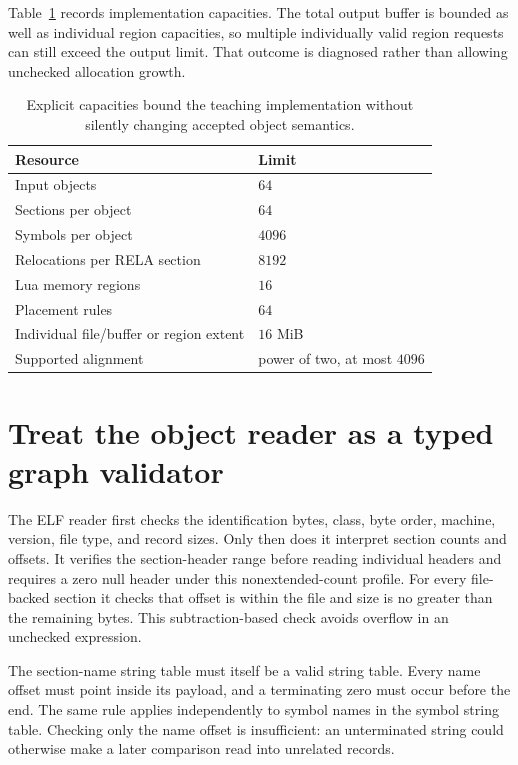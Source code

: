Table~\ref{tab:ch60-capacities} records implementation capacities.
The total output buffer is bounded as well as individual region capacities, so multiple individually valid region requests can still exceed the output limit.
That outcome is diagnosed rather than allowing unchecked allocation growth.

\begin{table}[htbp]
\caption{Explicit capacities bound the teaching implementation without silently changing accepted object semantics.}
\label{tab:ch60-capacities}
\centering
\begin{tabular}{ll}
\toprule
Resource & Limit \\
\midrule
Input objects & $64$ \\
Sections per object & $64$ \\
Symbols per object & $4096$ \\
Relocations per RELA section & $8192$ \\
Lua memory regions & $16$ \\
Placement rules & $64$ \\
Individual file/buffer or region extent & $16$ MiB \\
Supported alignment & power of two, at most $4096$ \\
\bottomrule
\end{tabular}
\end{table}

\section{Treat the object reader as a typed graph validator}
\label{sec:ch60-reader}

The ELF reader first checks the identification bytes, class, byte order, machine, version, file type, and record sizes.
Only then does it interpret section counts and offsets.
It verifies the section-header range before reading individual headers and requires a zero null header under this nonextended-count profile.
For every file-backed section it checks that offset is within the file and size is no greater than the remaining bytes.
This subtraction-based check avoids overflow in an unchecked  expression.

The section-name string table must itself be a valid string table.
Every name offset must point inside its payload, and a terminating zero must occur before the end.
The same rule applies independently to symbol names in the symbol string table.
Checking only the name offset is insufficient: an unterminated string could otherwise make a later comparison read into unrelated records.

